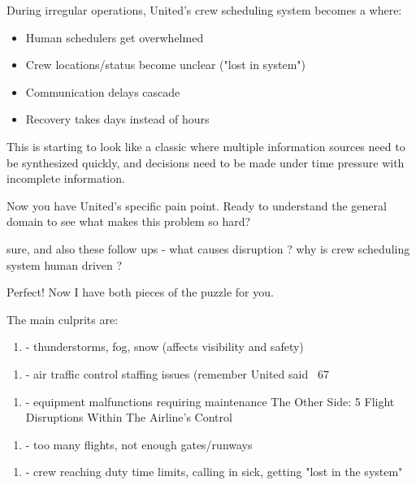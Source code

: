  During irregular operations, United's crew scheduling system becomes a 
 where:

\begin{itemize}
\item Human schedulers get overwhelmed
\end{itemize}
\begin{itemize}
\item Crew locations/status become unclear ("lost in system")
\end{itemize}
\begin{itemize}
\item Communication delays cascade
\end{itemize}
\begin{itemize}
\item Recovery takes days instead of hours
\end{itemize}

This is starting to look like a classic 
 where multiple information sources need to be synthesized quickly, and decisions need to be made under time pressure with incomplete information.

Now you have United's specific pain point. Ready to understand the general domain to see what makes this problem so hard?


sure, and also these follow ups - what causes disruption ? why is crew scheduling system human driven ?


Perfect! Now I have both pieces of the puzzle for you.

The main culprits are:

\begin{enumerate}
\item {} - thunderstorms, fog, snow (affects visibility and safety)
\end{enumerate}
\begin{enumerate}
\item {} - air traffic control staffing issues (remember United said ~67%
\end{enumerate}
\begin{enumerate}
\item {} - equipment malfunctions requiring maintenance The Other Side: 5 Flight Disruptions Within The Airline’s Control
\end{enumerate}
\begin{enumerate}
\item {} - too many flights, not enough gates/runways
\end{enumerate}
\begin{enumerate}
\item {} - crew reaching duty time limits, calling in sick, getting "lost in the system"
\end{enumerate}

